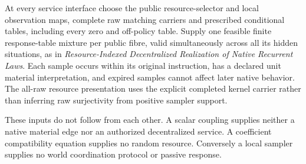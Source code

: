 \documentclass{article}
\begin{document}
At every service interface choose the public resource-selector and local observation maps, complete raw matching carriers and prescribed conditional tables, including every zero and off-policy table. Supply one feasible finite response-table mixture per public fibre, valid simultaneously across all its hidden situations, as in \emph{Resource-Indexed Decentralized Realization of Native Recurrent Laws}. Each sample occurs within its original instruction, has a declared unit material interpretation, and expired samples cannot affect later native behavior. The all-raw resource presentation uses the explicit completed kernel carrier rather than inferring raw surjectivity from positive sampler support.

These inputs do not follow from each other. A scalar coupling supplies neither a native material edge nor an authorized decentralized service. A coefficient compatibility equation supplies no random resource. Conversely a local sampler supplies no world coordination protocol or passive response.
\end{document}
